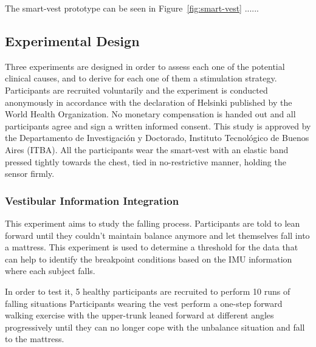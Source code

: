 \documentclass[conference]{IEEEtran}
\begin{document}
The smart-vest prototype can be seen in Figure~\ref{fig:smart-vest} ......


\subsection{Experimental Design}
\label{sec:experimental}

Three experiments are designed in order to assess each one of the potential clinical causes, and to derive for each one of them a stimulation strategy.  Participants are recruited voluntarily and the experiment is conducted anonymously in accordance with the declaration of Helsinki published by the World Health Organization. No monetary compensation is handed out and all participants agree and sign a written informed consent. This study is approved by the Departamento de Investigación y Doctorado, Instituto Tecnológico de Buenos Aires (ITBA).  All the participants wear the smart-vest with an elastic band pressed tightly towards the chest, tied in no-restrictive manner, holding the sensor firmly. 


\subsubsection{Vestibular Information Integration}

This experiment aims to study the falling process. Participants are told to lean forward until they couldn't maintain balance anymore and let themselves fall into a mattress. This experiment is used to determine a threshold for the data that can help to identify the breakpoint conditions based on the IMU information where each subject falls.

In order to test it, 5 healthy participants are recruited to perform 10 runs of falling situations  Participants wearing the vest  perform a one-step forward walking exercise with the upper-trunk leaned forward at different angles progressively until they can no longer cope with the unbalance situation and fall to the mattress.
\end{document}
